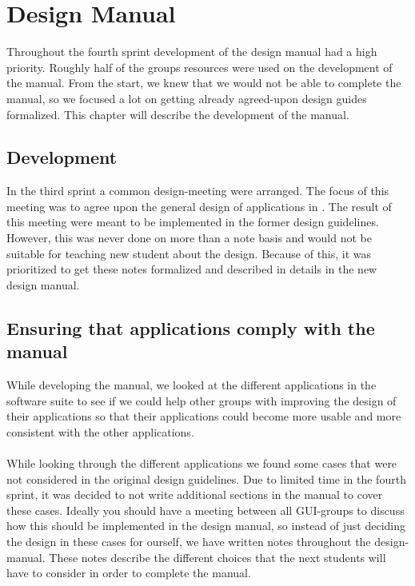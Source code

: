 
\chapter{Design Manual}
\label{cha:design_manual}


Throughout the fourth sprint development of the design manual had a high priority. Roughly half of the groups resources were used on the development of the manual. From the start, we knew that we would not be able to complete the manual, so we focused a lot on getting already agreed-upon design guides formalized. This chapter will describe the development of the manual.

\section{Development}
\label{sec:development}
In the third sprint a common design-meeting were arranged. The focus of this meeting was to agree upon the general design of applications in \giraf. The result of this meeting were meant to be implemented in the former design guidelines. However, this was never done on more than a note basis and would not be suitable for teaching new student about the design. Because of this, it was prioritized to get these notes formalized and described in details in the new design manual. 

\section{Ensuring that applications comply with the manual}
\label{sec:ensuring_that_applications_comply_with_the_manual}
While developing the manual, we looked at the different applications in the \giraf software suite to see if we could help other groups with improving the design of their applications so that their applications could become more usable and more consistent with the other applications. 
\\\\
While looking through the different applications we found some cases that were not considered in the original design guidelines. Due to limited time in the fourth sprint, it was decided to not write additional sections in the manual to cover these cases. Ideally you should have a meeting between all GUI-groups to discuss how this should be implemented in the design manual, so instead of just deciding the design in these cases for ourself, we have written notes throughout the design-manual. These notes describe the different choices that the next students will have to consider in order to complete the manual. 